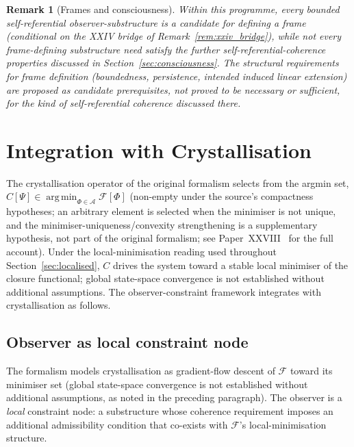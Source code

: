\documentclass[12pt]{article}
\newtheorem{remark}[theorem]{Remark}
\newcommand{\Fcal}{\mathcal{F}}
\begin{document}
\begin{remark}[Frames and consciousness]
Within this programme, every bounded self-referential observer-substructure is a \emph{candidate} for defining a frame (conditional on the XXIV bridge of Remark~\ref{rem:xxiv_bridge}), while not every frame-defining substructure need satisfy the further self-referential-coherence properties discussed in Section~\ref{sec:consciousness}. The structural requirements for frame definition (boundedness, persistence, intended induced linear extension) are proposed as candidate prerequisites, not proved to be necessary or sufficient, for the kind of self-referential coherence discussed there.
\end{remark}

\section{Integration with Crystallisation}\label{sec:crystallisation}

The crystallisation operator of the original formalism selects from the argmin set, $C[\Psi] \in \operatorname*{arg\,min}_{\Phi \in \mathcal A} \Fcal[\Phi]$ (non-empty under the source's compactness hypotheses; an arbitrary element is selected when the minimiser is not unique, and the minimiser-uniqueness/convexity strengthening is a supplementary hypothesis, not part of the original formalism; see Paper~XXVIII~\citep{SmartXXVIII} for the full account). Under the local-minimisation reading used throughout Section~\ref{sec:localised}, $C$ drives the system toward a stable local minimiser of the closure functional; global state-space convergence is not established without additional assumptions. The observer-constraint framework integrates with crystallisation as follows.

\subsection{Observer as local constraint node}

The formalism models crystallisation as gradient-flow descent of $\Fcal$ toward its minimiser set (global state-space convergence is not established without additional assumptions, as noted in the preceding paragraph). The observer is a \textit{local} constraint node: a substructure whose coherence requirement imposes an additional admissibility condition that co-exists with $\Fcal$'s local-minimisation structure.
\end{document}
